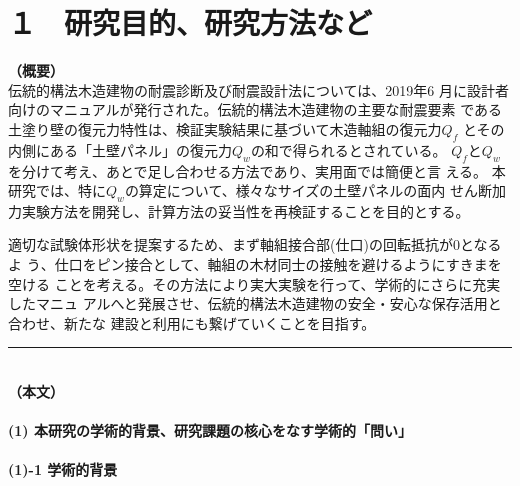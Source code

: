 \documentclass[11pt,a4paper,uplatex,dvipdfmx]{ujarticle} 		%
\newcommand{\研究課題名}{伝統的な木造土塗り壁の復元力に及ぼす軸組の影響に関する実験研究}
\newcommand{\研究機関名}{公立鳥取環境大学}
\newcommand{\研究代表者氏名}{中治弘行}
\newcommand{\私}{{\研究代表者氏名}}
\newcommand{\研究期間の最終元号年度}{8}  %
\begin{document}

\section{１　研究目的、研究方法など}

\noindent
\textbf{（概要）}\\
\hspace{1zw}伝統的構法木造建物の耐震診断及び耐震設計法については、2019年6
月に設計者向けのマニュアルが発行された。伝統的構法木造建物の主要な耐震要素
である土塗り壁の復元力特性は、検証実験結果に基づいて木造軸組の復元力$Q_f$
とその内側にある「土壁パネル」の復元力$Q_w$の和で得られるとされている。
$Q_f$と$Q_w$を分けて考え、あとで足し合わせる方法であり、実用面では簡便と言
える。
本研究では、特に$Q_w$の算定について、様々なサイズの土壁パネルの面内
せん断加力実験方法を開発し、計算方法の妥当性を再検証することを目的とする。

適切な試験体形状を提案するため、まず軸組接合部(仕口)の回転抵抗が0となるよ
う、仕口をピン接合として、軸組の木材同士の接触を避けるようにすきまを空ける
ことを考える。その方法により実大実験を行って、学術的にさらに充実したマニュ
アルへと発展させ、伝統的構法木造建物の安全・安心な保存活用と合わせ、新たな
建設と利用にも繋げていくことを目指す。
\vspace*{0zw}	%

\noindent
\rule{\linewidth}{1pt}\\
\noindent
\textbf{（本文）}
\vspace{-1em}

\paragraph{(1) 本研究の学術的背景、研究課題の核心をなす学術的「問い」}
\mbox{}\vspace{-\baselineskip}
\paragraph{(1)-1 学術的背景}
\mbox{}\par
\end{document}
